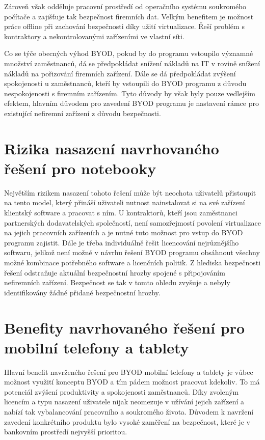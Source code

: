 Zároveň však odděluje pracovní prostředí od operačního systému soukromého počítače a zajišťuje tak bezpečnost firemních dat. Velkým benefitem je možnost práce offline při zachování bezpečnosti díky užití virtualizace. Řeší problém s kontraktory a nekontrolovanými zařízeními ve vlastní síti.

Co se týče obecných výhod BYOD, pokud by do programu vstoupilo významné množství zaměstnanců, dá se předpokládat snížení nákladů na IT v rovině snížení nákladů na pořizování firemních zařízení. Dále se dá předpokládat zvýšení spokojenosti u zaměstnanců, kteří by vstoupili do BYOD programu z důvodu nespokojenosti s firemním zařízením. Tyto důvody by však byly pouze vedlejším efektem, hlavním důvodem pro zavedení BYOD programu je nastavení rámce pro existující nefiremní zařízení z důvodu bezpečnosti.

\section{Rizika nasazení navrhovaného řešení pro notebooky}
Největším rizikem nasazení tohoto řešení může být neochota uživatelů přistoupit na tento model, který přináší uživateli nutnost nainstalovat si na své zařízení klientský software a pracovat s ním. U kontraktorů, kteří jsou zaměstnanci partnerských dodavatelských společností, není samozřejmostí povolení virtualizace na jejich pracovních zařízeních a je nutné tuto možnost pro vstup do BYOD programu zajistit.  Dále je třeba individuálně řešit licencování nejrůznějšího softwaru, jelikož není možné v návrhu řešení BYOD programu obsáhnout všechny možné kombinace potřebného software a licenčních politik. Z hlediska bezpečnosti řešení odstraňuje aktuální bezpečnostní hrozby spojené s připojováním nefiremních zařízení. Bezpečnost se tak v tomto ohledu zvyšuje a nebyly identifikovány žádné přidané bezpečnostní hrozby. 

\section{Benefity navrhovaného řešení pro mobilní telefony a tablety}
Hlavní benefit navrženého řešení pro BYOD mobilní telefony a tablety je vůbec možnost využití konceptu BYOD a tím pádem možnost pracovat kdekoliv. To má potenciál zvýšení produktivity a spokojenosti zaměstnanců. Díky zvoleným licencím a typu nasazení uživatele nijak neomezuje v užívání jejich zařízení a nabízí tak vybalancování pracovního a soukromého života. Důvodem k navržení zavedení konkrétního produktu bylo vysoké zaměření na bezpečnost, které je v bankovním prostředí nejvyšší prioritou.

